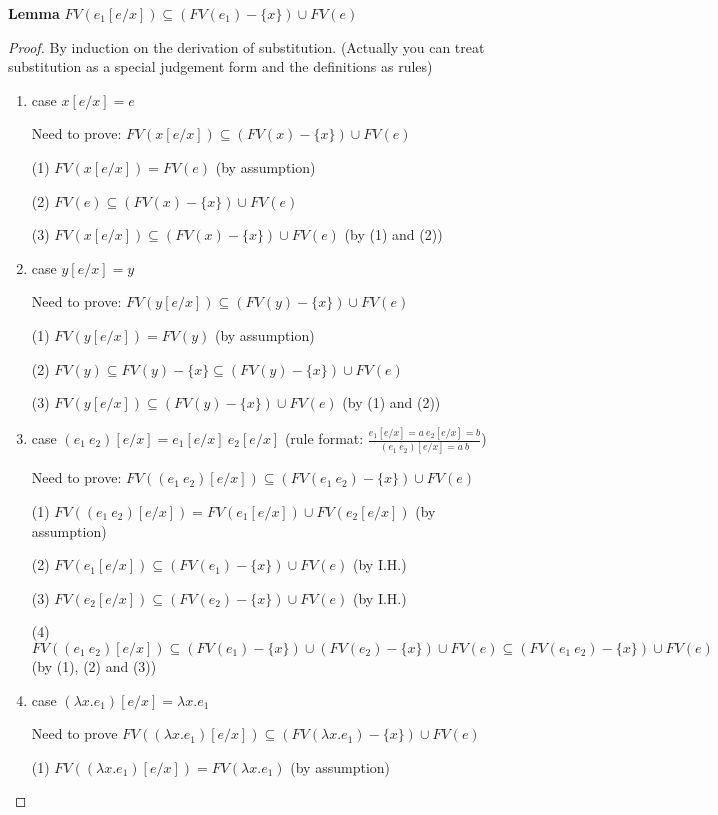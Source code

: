 \documentclass[12pt]{article}
\begin{document}
\textbf{Lemma}	$FV(e_1[e/x]) \subseteq (FV(e_1) - \{x\}) \cup FV(e)$


\begin{proof}
	By induction on the derivation of substitution. (Actually you can treat substitution as a special judgement form and the definitions as rules)
	\begin{enumerate}
		\item case $x[e/x] = e$
		
		Need to prove: $FV(x[e/x]) \subseteq (FV(x)-\{x\}) \cup FV(e)$
		
		(1) $FV(x[e/x])=FV(e)$ (by assumption)
		
		(2) $FV(e) \subseteq (FV(x) - \{x\}) \cup FV(e)$
		
		(3) $FV(x[e/x]) \subseteq (FV(x)-\{x\}) \cup FV(e)$ (by (1) and (2))
		
		\item case $y[e/x] = y$
		
		Need to prove: $FV(y[e/x]) \subseteq (FV(y)-\{x\}) \cup FV(e)$
		
		(1) $FV(y[e/x])=FV(y)$ (by assumption)
		
		(2) $FV(y) \subseteq FV(y)-\{x\} \subseteq (FV(y)-\{x\}) \cup FV(e)$
		
		(3) $FV(y[e/x]) \subseteq (FV(y)-\{x\}) \cup FV(e)$ (by (1) and (2))
		
		\item case $(e_1\ e_2)[e/x] = e_1[e/x]\ e_2[e/x]$ (rule format: $\frac{e_1[e/x]=a\ e_2[e/x]=b}{(e_1\ e_2)[e/x] = a\ b}$)
		
		Need to prove: $FV((e_1\ e_2)[e/x]) \subseteq (FV(e_1\ e_2) -\{x\}) \cup FV(e)$
		
		(1) $FV((e_1\ e_2)[e/x]) = FV(e_1[e/x]) \cup FV(e_2[e/x])$ (by assumption)
		
		(2) $FV(e_1[e/x]) \subseteq (FV(e_1) -\{x\}) \cup FV(e)$ (by I.H.)
		
		(3) $FV(e_2[e/x]) \subseteq (FV(e_2) -\{x\}) \cup FV(e)$ (by I.H.)
		
		(4) $FV((e_1\ e_2)[e/x]) \subseteq (FV(e_1) -\{x\}) \cup (FV(e_2) -\{x\}) \cup FV(e) \subseteq (FV(e_1\ e_2) -\{x\}) \cup FV(e)$ (by (1), (2) and (3))
		
		\item case $(\lambda x.e_1)[e/x] = \lambda x.e_1$
		
		Need to prove $FV((\lambda x.e_1)[e/x]) \subseteq (FV(\lambda x.e_1) -\{x\}) \cup FV(e)$
		
		(1) $FV((\lambda x.e_1)[e/x]) = FV(\lambda x.e_1)$ (by assumption)
		

\end{enumerate}
\end{proof}
\end{document}
